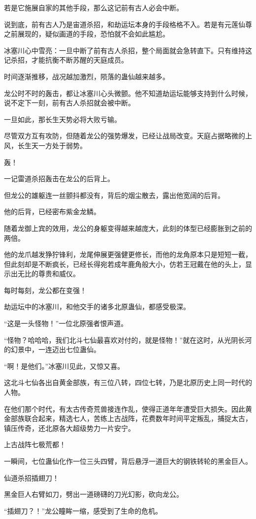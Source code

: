\begin{this_body}
若是它施展自家的其他手段，那么这记前有古人必会中断。

说到底，前有古人乃是宙道杀招，和劫运坛本身的手段格格不入。若是有元莲仙尊之前展现的，疑似画道的手段，恐怕就不会如此尴尬。

冰塞川心中雪亮：一旦中断了前有古人杀招，整个局面就会急转直下。只有维持这记杀招，才能抗衡不断苏醒的天庭成员。

时间逐渐推移，战况越加激烈，陨落的蛊仙越来越多。

龙公时不时的轰击，都让冰塞川心头微颤。他不知道劫运坛能够支持到什么时候，说不定下一刻，前有古人杀招就会被中断。

一旦如此，那长生天势必将大败亏输。

尽管双方互有攻防，但随着龙公的强势爆发，已经让战局改变。天庭占据略微的上风，长生天一方处于弱势。

轰！

一记雷道杀招轰击在龙公的后背上。

但龙公的雄躯连一丝颤抖都没有，背后的烟尘散去，露出他宽阔的后背。

他的后背，已经密布紫金龙鳞。

随着龙御上宾的效用，龙公的身躯变得越来越庞大，此刻的体型已经膨胀到之前的两倍。

他的龙爪越发狰狞锋利，龙尾伸展更强健更修长，而他的龙角原本只是短短一截，但此刻却是不断疯长，已经长得宛若成年鹿角般大小，仿若王冠戴在他的头上，显示出无比的尊贵和威仪。

每时每刻，龙公都在变强！

劫运坛中的冰塞川，和他交手的诸多北原蛊仙，都感受极深。

“这是一头怪物！”一位北原强者恨声道。

“怪物？哈哈哈，我们北斗七仙最喜欢对付的，就是怪物！”就在这时，从光阴长河的幻景中，一连迈出七位蛊仙。

“啊！是他们。”冰塞川见此，又惊又喜。

这北斗七仙各出自黄金部族，有三位八转，四位七转，乃是北原历史上同一时代的人物。

在他们那个时代，有太古传奇荒兽接连作乱，使得正道年年遭受巨大损失。因此黄金部族联合起来，精选七人，苦练上古战阵，花费数年时间平定叛乱，捕捉太古，镇压传奇，还北原各大超级势力一片安宁。

上古战阵七极荒都！

一瞬间，七位蛊仙化作一位三头四臂，背后悬浮一道巨大的钢铁转轮的黑金巨人。

仙道杀招插翅刀！

黑金巨人右臂如刀，劈出一道磅礴的刀光幻影，砍向龙公。

“插翅刀？！”龙公瞳眸一缩，感受到了生命的危机。

\end{this_body}

